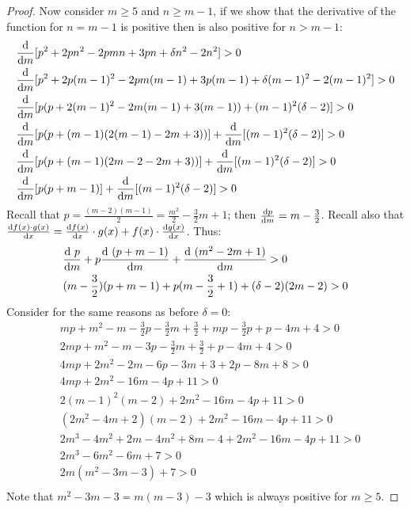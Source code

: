 \documentclass[version=3.21, pagesize, twoside=off, bibliography=totoc, DIV=calc, fontsize=12pt, a4paper]{scrartcl}
\begin{document}
\begin{proof}
	Now consider $m\geq5$ and $n\geq m-1$, if we show that the derivative of the function for $n=m-1$ is positive then is also positive for $n>m-1$: 
	\begin{align}
		&\dv{m}[p^2+2p n^2-2p m n+3p n+\delta n^2-2 n^2]>0 \\
		&\dv{m}[p^2+2p (m-1)^2-2p m (m-1)+3p (m-1)+\delta (m-1)^2-2 (m-1)^2]>0 \\
		&\dv{m}[p (p+2(m-1)^2-2m(m-1)+3(m-1))+(m-1)^2(\delta-2)]>0\\
		&\dv{m}[p (p+(m-1)(2(m-1)-2m+3))]+\dv{m}[(m-1)^2(\delta-2)]>0\\
		&\dv{m}[p (p+(m-1)(2m-2-2m+3))]+\dv{m}[(m-1)^2(\delta-2)]>0\\
		&\dv{m}[p (p+m-1)]+\dv{m}[(m-1)^2(\delta-2)]>0\\
	\end{align}
	Recall that $p=\frac{(m-2)(m-1)}{2}=\frac{m^2}{2}-\frac{3}{2}m+1$; then $\dv{p}{m}=m-\frac{3}{2}$. 
	Recall also that $\dv{f(x)\cdot g(x)}{x}=\dv{f(x)}{x}\cdot g(x) + f(x) \cdot \dv{g(x)}{x}$. Thus:
	\begin{align}
		&\dv{\ p}{m}(p+m-1)+p\dv{\ (p+m-1)}{m} +\dv{\ (m^2-2m+1)}{m}(\delta-2)>0\\
		&(m-\frac{3}{2})(p+m-1)+p(m-\frac{3}{2}+1)+(\delta-2)(2m-2)>0\\
	\end{align}
	Consider for the same reasons as before $\delta=0$:
	\begin{align}
		&mp+m^2-m-\frac{3}{2}p-\frac{3}{2}m+\frac{3}{2}+mp-\frac{3}{2}p+p-4m+4>0 \\
		&2mp+m^2-m-3p-\frac{3}{2}m+\frac{3}{2}+p-4m+4>0 \\
		&4mp+2m^2-2m-6p-3m+3+2p-8m+8>0 \\
		&4mp+2m^2-16m-4p+11>0 \\
		&2(m-1)^2(m-2)+2m^2-16m-4p+11>0\\
		&(2m^2-4m+2)(m-2)+2m^2-16m-4p+11>0\\
		&2m^3-4m^2+2m-4m^2+8m-4+2m^2-16m-4p+11>0\\
		&2m^3-6m^2-6m+7>0\\
		&2m(m^2-3m-3)+7>0\\
	\end{align}
	Note that $m^2-3m-3=m(m-3)-3$ which is always positive for $m\geq 5$.
\end{proof}
\end{document}
